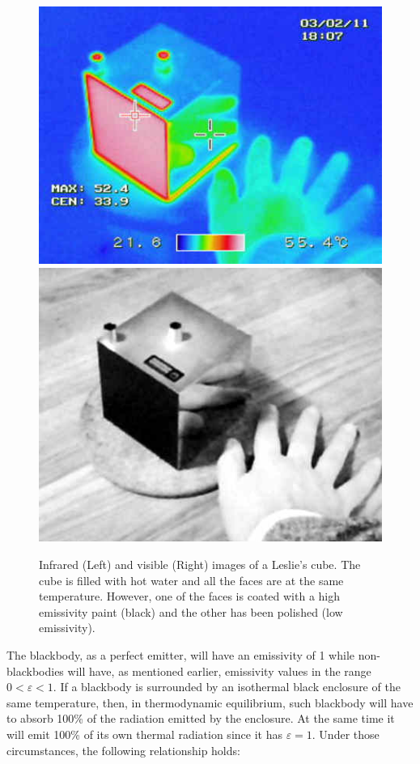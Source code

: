 		\begin{figure}[ht!]
			\centering
			\captionsetup{justification=centering,margin=2cm}
			\includegraphics[scale=0.55]{Figures/Chapter01/LesliesCube.jpg}
			\includegraphics[scale=0.52]{Figures/Chapter01/LesliesCube2.jpg}
			\caption{Infrared (Left) and visible (Right) images of a Leslie’s cube. The cube is filled with hot water and all the faces are at the same temperature. However,  one of the faces is coated with a high emissivity paint (black) and the other has been polished (low emissivity).}\label{fig1.5}
		\end{figure}
		
		The blackbody, as a perfect emitter, will have an emissivity of 1 while non-blackbodies will have, as mentioned earlier, emissivity values in the range $0<\varepsilon<1$. If a blackbody is surrounded by an isothermal black enclosure of the same temperature, then, in thermodynamic equilibrium, such blackbody will have to absorb 100\% of the radiation emitted by the enclosure. At the same time it will emit 100\% of its own thermal radiation since it has $\varepsilon=1$. Under those circumstances, the following relationship holds:
		
